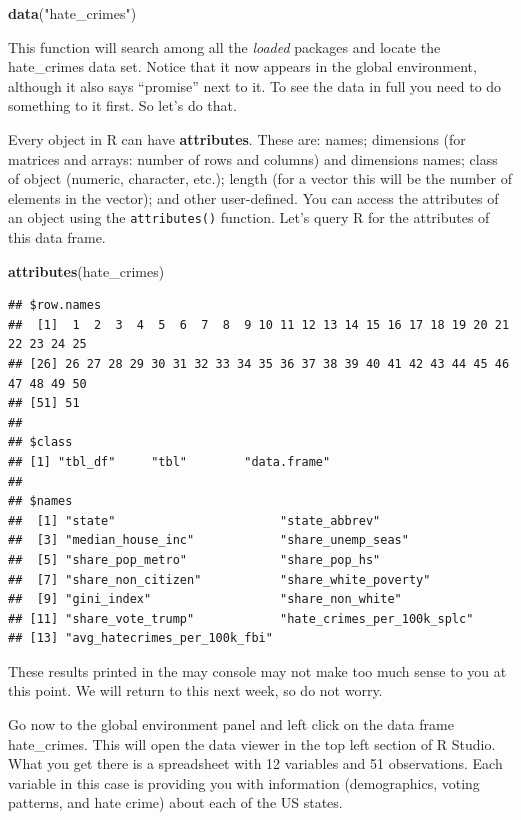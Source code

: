 \documentclass[]{book}
\newenvironment{Shaded}{\begin{snugshade}}{\end{snugshade}}
\newcommand{\KeywordTok}[1]{\textcolor[rgb]{0.13,0.29,0.53}{\textbf{#1}}}
\newcommand{\NormalTok}[1]{#1}
\newcommand{\StringTok}[1]{\textcolor[rgb]{0.31,0.60,0.02}{#1}}
\begin{document}
\begin{Shaded}
\begin{Highlighting}[]
\KeywordTok{data}\NormalTok{(}\StringTok{"hate_crimes"}\NormalTok{)}
\end{Highlighting}
\end{Shaded}

This function will search among all the \emph{loaded} packages and locate the hate\_crimes data set. Notice that it now appears in the global environment, although it also says ``promise'' next to it. To see the data in full you need to do something to it first. So let's do that.

Every object in R can have \textbf{attributes}. These are: names; dimensions (for matrices and arrays: number of rows and columns) and dimensions names; class of object (numeric, character, etc.); length (for a vector this will be the number of elements in the vector); and other user-defined. You can access the attributes of an object using the \texttt{attributes()} function. Let's query R for the attributes of this data frame.

\begin{Shaded}
\begin{Highlighting}[]
\KeywordTok{attributes}\NormalTok{(hate_crimes)}
\end{Highlighting}
\end{Shaded}

\begin{verbatim}
## $row.names
##  [1]  1  2  3  4  5  6  7  8  9 10 11 12 13 14 15 16 17 18 19 20 21 22 23 24 25
## [26] 26 27 28 29 30 31 32 33 34 35 36 37 38 39 40 41 42 43 44 45 46 47 48 49 50
## [51] 51
## 
## $class
## [1] "tbl_df"     "tbl"        "data.frame"
## 
## $names
##  [1] "state"                       "state_abbrev"               
##  [3] "median_house_inc"            "share_unemp_seas"           
##  [5] "share_pop_metro"             "share_pop_hs"               
##  [7] "share_non_citizen"           "share_white_poverty"        
##  [9] "gini_index"                  "share_non_white"            
## [11] "share_vote_trump"            "hate_crimes_per_100k_splc"  
## [13] "avg_hatecrimes_per_100k_fbi"
\end{verbatim}

These results printed in the may console may not make too much sense to you at this point. We will return to this next week, so do not worry.

Go now to the global environment panel and left click on the data frame hate\_crimes. This will open the data viewer in the top left section of R Studio. What you get there is a spreadsheet with 12 variables and 51 observations. Each variable in this case is providing you with information (demographics, voting patterns, and hate crime) about each of the US states.
\end{document}
